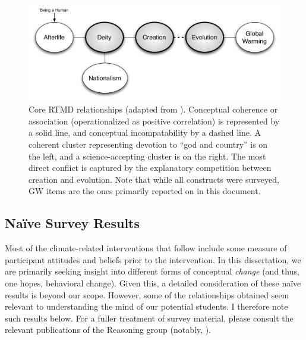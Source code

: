 \begin{figure}
    \includegraphics[width=6.5in]{rtmd.pdf}
    \caption{Core RTMD relationships (adapted from ).
        Conceptual coherence or association (operationalized as positive
        correlation) is represented by a solid line, and conceptual
        incompatability by a dashed line. A coherent cluster representing
        devotion to “god and country” is on the left, and a science-accepting
        cluster is on the right. The most direct conflict is captured by the
        explanatory competition between creation and evolution. Note that while
        all constructs were surveyed, GW items are the ones primarily reported on in this
        document.}
    \label{fig:rtmd}
\end{figure}

\subsection{Na\"ive Survey Results}
\label{sec:naive}

Most of the climate-related interventions that follow include some measure of
participant attitudes and beliefs prior to the intervention. In this
dissertation, we are primarily seeking insight into different forms of
conceptual \emph{change} (and thus, one hopes, behavioral change). Given this, a
detailed consideration of these na\"ive results is beyond our scope. However,
some of the relationships obtained seem relevant to understanding the mind of
our potential students. I therefore note such results below. For a fuller treatment
of survey material, please consult the relevant publications of the Reasoning
group (notably, ).

